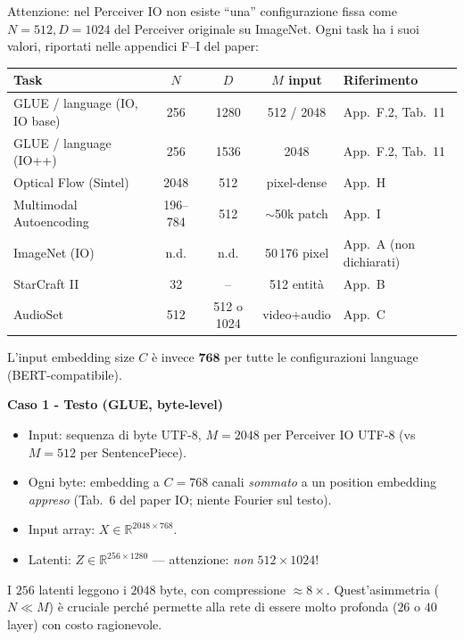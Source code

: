 \documentclass[
  11pt,
]{article}
\begin{document}
\begin{notabox}[title={\textbf{Le dimensioni $N$ e $D$ dei latenti variano con il task}}]
Attenzione: nel Perceiver IO non esiste ``una'' configurazione fissa come $N=512, D=1024$ del Perceiver originale su ImageNet. Ogni task ha i suoi valori, riportati nelle appendici F--I del paper:

\medskip
\begin{center}
{\small
\begin{tabular}{@{}lcccl@{}}
\toprule
\textbf{Task} & \textbf{$N$} & \textbf{$D$} & \textbf{$M$ input} & \textbf{Riferimento} \\
\midrule
GLUE / language (IO, IO base) & 256 & 1280 & 512 / 2048 & App.\ F.2, Tab.\ 11 \\
GLUE / language (IO++) & 256 & 1536 & 2048 & App.\ F.2, Tab.\ 11 \\
Optical Flow (Sintel) & 2048 & 512 & pixel-dense & App.\ H \\
Multimodal Autoencoding & 196--784 & 512 & $\sim$50k patch & App.\ I \\
ImageNet (IO) & n.d. & n.d. & 50\,176 pixel & App.\ A (non dichiarati) \\
StarCraft II & 32 & -- & 512 entità & App.\ B \\
AudioSet & 512 & 512 o 1024 & video+audio & App.\ C \\
\bottomrule
\end{tabular}
}
\end{center}
\medskip
L'input embedding size $C$ è invece $\mathbf{768}$ per tutte le configurazioni language (BERT-compatibile).
\end{notabox}

\textbf{Caso 1 - Testo (GLUE, byte-level)}

\begin{itemize}
\item Input: sequenza di byte UTF-8, $M = 2048$ per Perceiver IO UTF-8 (vs $M = 512$ per SentencePiece).
\item Ogni byte: embedding a $C = 768$ canali \emph{sommato} a un position embedding \emph{appreso} (Tab.~6 del paper IO; niente Fourier sul testo).
\item Input array: $X \in \mathbb{R}^{2048 \times 768}$.
\item Latenti: $Z \in \mathbb{R}^{256 \times 1280}$ --- attenzione: \emph{non} $512 \times 1024$!
\end{itemize}

I $256$ latenti leggono i $2048$ byte, con compressione $\approx 8\times$. Quest'asimmetria ($N \ll M$) è cruciale perché permette alla rete di essere molto profonda ($26$ o $40$ layer) con costo ragionevole.
\end{document}

